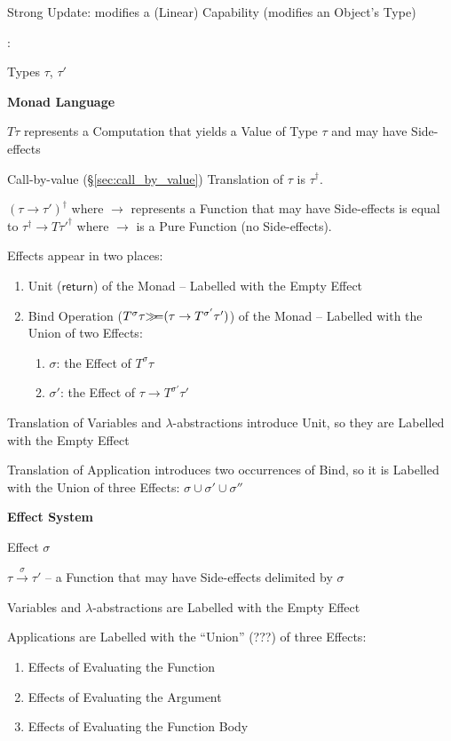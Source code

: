 Strong Update: modifies a (Linear) Capability (modifies an Object's
Type)



\asterism


\cite{wadler-thiemann03}:

Types $\tau$, $\tau'$


\textbf{Monad Language}

$T \tau$ represents a Computation that yields a Value
of Type $\tau$ and may have Side-effects

Call-by-value (\S\ref{sec:call_by_value}) Translation of $\tau$ is
$\tau^\dag$.

$(\tau \rightarrow \tau')^\dag$ where $\rightarrow$ represents a
Function that may have Side-effects is equal to $\tau^\dag \rightarrow
T \tau'^\dag$ where $\rightarrow$ is a Pure Function (no Side-effects).

Effects appear in two places:
\begin{enumerate}
  \item Unit ($\mathsf{return}$) of the Monad -- Labelled with the
    Empty Effect
  \item Bind Operation ($T^\sigma\tau \mathsf{\gg\kern-3pt=} (\tau \rightarrow
    T^{\sigma'}\tau')$) of the Monad -- Labelled with the Union of two
    Effects: %
    \begin{enumerate}
      \item $\sigma$: the Effect of $T^\sigma\tau$
      \item $\sigma'$: the Effect of $\tau \rightarrow
        T^{\sigma'}\tau'$
    \end{enumerate}
\end{enumerate}

Translation of Variables and $\lambda$-abstractions introduce Unit, so
they are Labelled with the Empty Effect

Translation of Application introduces two occurrences of Bind, so it
is Labelled with the Union of three Effects: $\sigma \cup \sigma' \cup
\sigma''$ %


\textbf{Effect System}

Effect $\sigma$

$\tau \xrightarrow{\sigma} \tau'$ -- a Function that may have
Side-effects delimited by $\sigma$

Variables and $\lambda$-abstractions are Labelled with the Empty
Effect

Applications are Labelled with the ``Union'' (???) of three Effects:
\begin{enumerate}
  \item Effects of Evaluating the Function
  \item Effects of Evaluating the Argument
  \item Effects of Evaluating the Function Body
\end{enumerate}


